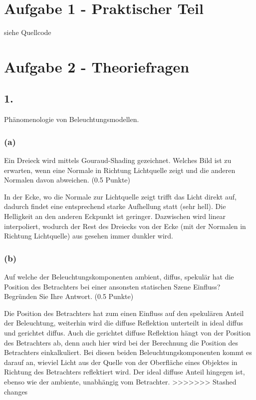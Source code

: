 \documentclass[12pt]{scrreprt}
\begin{document}


\chapter*{Aufgabe 1 - Praktischer Teil}

siehe Quellcode

\chapter*{Aufgabe 2 - Theoriefragen}
\section*{1.}
Phänomenologie von Beleuchtungsmodellen.
\subsection*{(a)}
Ein Dreieck wird mittels Gouraud-Shading gezeichnet. Welches Bild ist zu erwarten, wenn eine Normale in Richtung Lichtquelle zeigt und die anderen Normalen davon abweichen. (0.5 Punkte)

In der Ecke, wo die Normale zur Lichtquelle zeigt trifft das Licht direkt auf, dadurch findet eine entsprechend starke Aufhellung statt (sehr hell). Die Helligkeit an den anderen Eckpunkt ist geringer. Dazwischen wird linear interpoliert, wodurch der Rest des Dreiecks von der Ecke (mit der Normalen in Richtung Lichtquelle) aus gesehen immer dunkler wird.

\subsection*{(b)}
Auf welche der Beleuchtungskomponenten ambient, diffus, spekulär hat die Position des Betrachters bei einer ansonsten statischen Szene Einfluss? Begründen Sie Ihre Antwort. (0.5 Punkte)

Die Position des Betrachters hat zum einen Einfluss auf den spekulären Anteil der Beleuchtung, weiterhin wird die diffuse Reflektion unterteilt in ideal diffus und gerichtet diffus. Auch die gerichtet diffuse Reflektion hängt von der Position des Betrachters ab, denn auch hier wird bei der Berechnung die Position des Betrachters einkalkuliert. Bei diesen beiden Beleuchtungskomponenten kommt es darauf an, wieviel Licht aus der Quelle von der Oberfläche eines Objektes in Richtung des Betrachters reflektiert wird.
Der ideal diffuse Anteil hingegen ist, ebenso wie der ambiente, unabhängig vom Betrachter.
>>>>>>> Stashed changes
\end{document}
